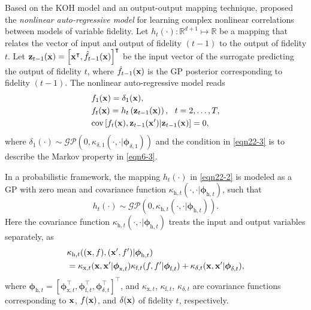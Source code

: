 \documentclass[iicol,sn-basic]{sn-jnl}%
\begin{document}
Based on the KOH model and an output-output mapping technique, \cite{Perdikaris2017} proposed the \textit{nonlinear auto-regressive model} for learning complex nonlinear correlations between models of variable fidelity.
Let $h_{t}(\cdot):\mathbb{R}^{d+1} \mapsto \mathbb{R}$ be a mapping that relates the vector of input and output of fidelity $(t-1)$ to the output of fidelity $t$.
Let ${\bf z}_{t-1}({\bf x})=\left[{\bf x}^\intercal,\hat{f}_{t-1}({\bf x})\right]^\intercal$ be the input vector of the surrogate predicting the output of fidelity $t$, where $\hat{f}_{t-1}({\bf x})$ is the GP posterior corresponding to fidelity $(t-1)$.
The nonlinear auto-regressive model reads~\citep{Perdikaris2017}
\begin{subequations}\label{eqn22}
	\begin{align}
		&f_1({\bf x})=\delta_1({\bf x}) \label{eqn22-1},\\
		&f_{t}({\bf x})=h_{t}\left({{\bf z}_{t-1}({\bf x})}\right), \ \  t=2,\dots,T \label{eqn22-2},\\
		&\text{cov}\left[f_{t}({\bf x}),{\bf z}_{t-1}({\bf x}')|{\bf z}_{t-1}({\bf x})\right]=0 
		\label{eqn22-3},
	\end{align}
\end{subequations}
where $\delta_1(\cdot) \sim \mathcal{GP}\left(0, \kappa_{\delta,1}(\cdot,\cdot|{\boldsymbol \phi}_{\delta,1})\right)$ and the condition in \cref{eqn22-3} is to describe the Markov property in \cref{eqn6-3}.

In a probabilistic framework, the mapping $h_{t}(\cdot)$ in \cref{eqn22-2} is modeled as a GP with zero mean and covariance function $\kappa_{\text{h},t}(\cdot,\cdot|{\boldsymbol \phi}_{\text{h},t})$, such that
\begin{equation}\label{eqn23}
	h_{t}(\cdot) \sim \mathcal{GP}\left(0, \kappa_{\text{h},t}(\cdot,\cdot|{\boldsymbol \phi}_{\text{h},t})\right).
\end{equation} 
Here the covariance function $\kappa_{\text{h},t}(\cdot,\cdot|{\boldsymbol \phi}_{\text{h},t})$ treats the input and output variables separately, as
\begin{equation}\label{eqn24}
	\begin{aligned}
		&\kappa_{\text{h},t}(({\bf x},f),({\bf x'},f')|{\boldsymbol \phi}_{\text{h},t})\\  
		& =\kappa_{\text{x},t}({\bf x},{\bf x}'|{\boldsymbol \phi}_{\text{x},t})\kappa_{\text{f},t}(f,f'|{\boldsymbol \phi}_{\text{f},t}) + \kappa_{\delta,t}({\bf x},{\bf x}'|{\boldsymbol \phi}_{\delta,t}),
	\end{aligned}
\end{equation}
where ${\boldsymbol \phi}_{\text{h},t}=[{\boldsymbol \phi}_{\text{x},t}^\intercal,{\boldsymbol \phi}_{\text{f},t}^\intercal,{\boldsymbol \phi}_{\delta,t}^\intercal]^\intercal$, and $\kappa_{\text{x},t}$, $\kappa_{\text{f},t}$, $\kappa_{\delta,t}$ are covariance functions corresponding to ${\bf x}$, $f({\bf x})$, and $\delta({\bf x})$ of fidelity $t$, respectively.
\end{document}
